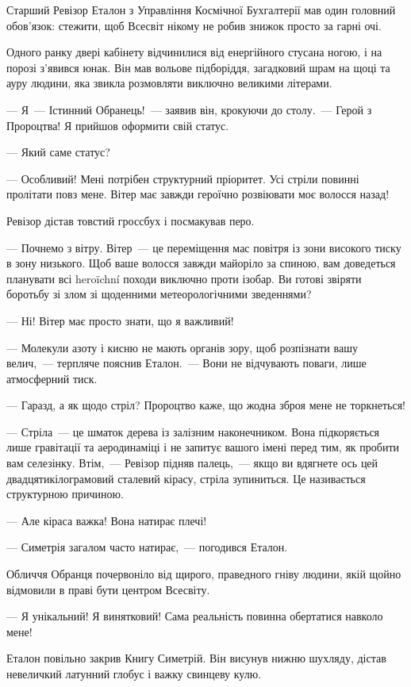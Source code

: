 \documentclass[12pt, a4paper, openany]{book}
\begin{document}
\begin{terrybox}
Старший Ревізор Еталон з Управління Космічної Бухгалтерії мав один головний обов'язок: стежити, щоб Всесвіт нікому не робив знижок просто за гарні очі.

Одного ранку двері кабінету відчинилися від енергійного стусана ногою, і на порозі з'явився юнак. Він мав вольове підборіддя, загадковий шрам на щоці та ауру людини, яка звикла розмовляти виключно великими літерами.

--- Я~--- Істинний Обранець!~--- заявив він, крокуючи до столу.~--- Герой з Пророцтва! Я прийшов оформити свій статус.

--- Який саме статус?

--- Особливий! Мені потрібен структурний пріоритет. Усі стріли повинні пролітати повз мене. Вітер має завжди героїчно розвіювати моє волосся назад!

\medskip
Ревізор дістав товстий гроссбух і посмакував перо.

--- Почнемо з вітру. Вітер~--- це переміщення мас повітря із зони високого тиску в зону низького. Щоб ваше волосся завжди майоріло за спиною, вам доведеться планувати всі heroïchní походи виключно проти ізобар. Ви готові звіряти боротьбу зі злом зі щоденними метеорологічними зведеннями?

--- Ні! Вітер має просто знати, що я важливий!

--- Молекули азоту і кисню не мають органів зору, щоб розпізнати вашу велич,~--- терпляче пояснив Еталон.~--- Вони не відчувають поваги, лише атмосферний тиск.

--- Гаразд, а як щодо стріл? Пророцтво каже, що жодна зброя мене не торкнеться!

--- Стріла~--- це шматок дерева із залізним наконечником. Вона підкоряється лише гравітації та аеродинаміці і не запитує вашого імені перед тим, як пробити вам селезінку. Втім,~--- Ревізор підняв палець,~--- якщо ви вдягнете ось цей двадцятикілограмовий сталевий кірасу, стріла зупиниться. Це називається структурною причиною.

--- Але кіраса важка! Вона натирає плечі!

--- Симетрія загалом часто натирає,~--- погодився Еталон.

\medskip
Обличчя Обранця почервоніло від щирого, праведного гніву людини, якій щойно відмовили в праві бути центром Всесвіту.

--- Я унікальний! Я винятковий! Сама реальність повинна обертатися навколо мене!

\medskip
Еталон повільно закрив Книгу Симетрій. Він висунув нижню шухляду, дістав невеличкий латунний глобус і важку свинцеву кулю.


\end{terrybox}
\end{document}
